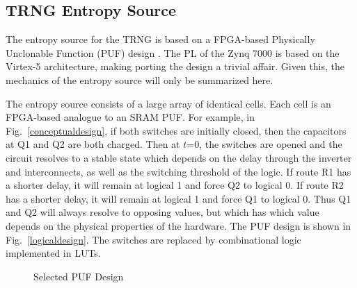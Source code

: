 \documentclass[journal]{IEEEtran}
\begin{document}
\subsection{TRNG Entropy Source}

The entropy source for the TRNG is based on a FPGA-based Physically Unclonable Function (PUF) design \cite{fpga_puf}. The PL of the Zynq 7000 is based on the Virtex-5 architecture, making porting the design a trivial affair. Given this,  the mechanics of the entropy source will only be summarized here. 

The entropy source consists of a large array of identical cells. Each cell is an FPGA-based analogue to an SRAM PUF. For example, in Fig.~\ref{conceptualdesign}, if both switches are initially closed, then the capacitors at Q1 and Q2 are both charged. Then at $t$=0, the switches are opened and the circuit resolves to a stable state which depends on the  delay through the inverter and interconnects, as well as the switching threshold of the logic. If route R1 has a shorter delay, it will remain at logical 1 and force Q2 to logical 0. If route R2 has a shorter delay, it will remain at logical 1 and force Q1 to logical 0. Thus Q1 and Q2 will always resolve to opposing values, but which has which value depends on the physical properties of the hardware.  The PUF design is shown in Fig.~\ref{logicaldesign}.  The switches are replaced by combinational logic implemented in LUTs.


\begin{figure}
 \centering
  \caption{Selected PUF Design}
  \label{fig:design}
\vspace{-5mm}
\end{figure}
\end{document}
